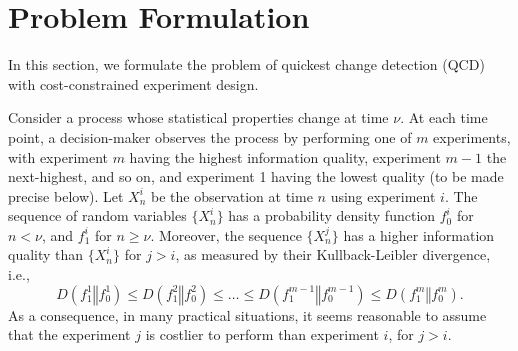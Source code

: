 \documentclass[journal, onecolumn]{IEEEtran}
\begin{document}






\section{Problem Formulation}
\label{sec:prob}

In this section, we formulate the problem of quickest change detection (QCD) with cost-constrained experiment design.

Consider a process whose statistical properties change at time $\nu$. At each time point, a decision-maker observes the process by performing one of $m$ experiments, with experiment $m$ having the highest information quality, experiment $m - 1$ the next-highest, and so on, and experiment 1 having the lowest quality (to be made precise below). Let $X_n^i$ be the observation at time $n$ using experiment $i$. The sequence of random variables $\{ X_n^i \}$ has a probability density function $f_0^i$ for $n < \nu$, and $f_1^i$ for $n \geq \nu$. Moreover, the sequence $\{ X_n^j \}$ has a higher information quality than $\{ X_n^i \}$ for $j > i$, as measured by their Kullback-Leibler divergence, i.e.,
\begin{equation} 
\label{eq:InformationQuality}
D(f_1^1 \mathrel{\Vert} f_0^1) \leq D(f_1^2 \mathrel{\Vert} f_0^2) \leq \dots \leq D(f_1^{m - 1} \mathrel{\Vert} f_0^{m - 1}) \leq D(f_1^m \mathrel{\Vert} f_0^m).
\end{equation}
As a consequence, in many practical situations, it seems reasonable to assume that the experiment $j$ is costlier to perform than experiment $i$, for $j > i$.
\end{document}
